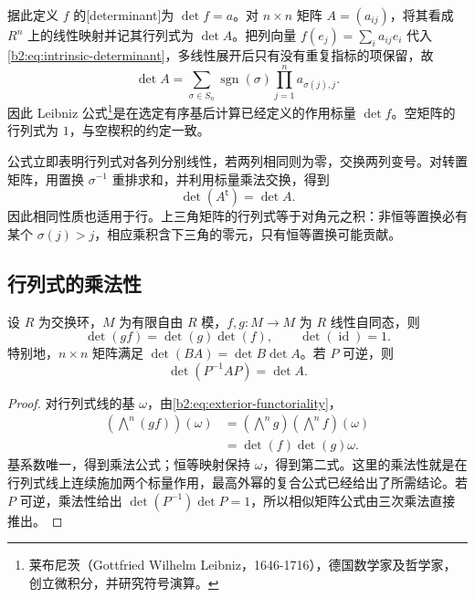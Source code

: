 \ProseParagraphBreak
据此定义 \(f\) 的[determinant]为 \(\det f=a\)。对 \(n\times n\) 矩阵 \(A=(a_{ij})\)，将其看成 \(R^n\) 上的线性映射并记其行列式为 \(\det A\)。把列向量 \(f(e_j)=\sum_i a_{ij}e_i\) 代入\eqref{b2:eq:intrinsic-determinant}，多线性展开后只有没有重复指标的项保留，故
\begin{equation}\label{b2:eq:determinant-leibniz}
	\det A=\sum_{\sigma\in S_n}\operatorname{sgn}(\sigma) \prod_{j=1}^n a_{\sigma(j),j}.
\end{equation}
因此 Leibniz 公式\footnote{莱布尼茨（Gottfried Wilhelm Leibniz，1646-1716），德国数学家及哲学家，创立微积分，并研究符号演算。}是在选定有序基后计算已经定义的作用标量 \(\det f\)。空矩阵的行列式为 \(1\)，与空楔积的约定一致。

\ProseParagraphBreak
公式立即表明行列式对各列分别线性，若两列相同则为零，交换两列变号。对转置矩阵，用置换 \(\sigma^{-1}\) 重排求和，并利用标量乘法交换，得到
\begin{equation}\label{b2:eq:determinant-transpose}
	\det(A^{\mathsf t})=\det A.
\end{equation}
因此相同性质也适用于行。上三角矩阵的行列式等于对角元之积：非恒等置换必有某个 \(\sigma(j)>j\)，相应乘积含下三角的零元，只有恒等置换可能贡献。

\subsection{行列式的乘法性}
\label{b2:subsec:0903:02}

\begin{theorem}[行列式的乘法性]\label{b2:thm:determinant-multiplicativity}
	设 \(R\) 为交换环，\(M\) 为有限自由 \(R\) 模，\(f,g:M\to M\) 为 \(R\) 线性自同态，则
	\[
		\det(gf)=\det(g)\det(f),\qquad \det(\operatorname{id})=1.
	\]
	特别地，\(n\times n\) 矩阵满足 \(\det(BA)=\det B\det A\)。若 \(P\) 可逆，则
	\[
		\det(P^{-1}AP)=\det A.
	\]
\end{theorem}
\begin{proof}
	对行列式线的基 \(\omega\)，由\eqref{b2:eq:exterior-functoriality}，
	\[
		\begin{aligned}
			\left(\bigwedge^n(gf)\right)(\omega) &=\left(\bigwedge^n g\right)\left(\bigwedge^n f\right)(\omega)\\
			&=\det(f)\det(g)\omega.
		\end{aligned}
	\]
	基系数唯一，得到乘法公式；恒等映射保持 \(\omega\)，得到第二式。这里的乘法性就是在行列式线上连续施加两个标量作用，最高外幂的复合公式已经给出了所需结论。若 \(P\) 可逆，乘法性给出 \(\det(P^{-1})\det P=1\)，所以相似矩阵公式由三次乘法直接推出。
\end{proof}

